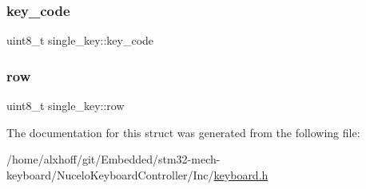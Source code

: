 \subsubsection{\texorpdfstring{key\+\_\+code}{key\_code}}
{\footnotesize\ttfamily uint8\+\_\+t single\+\_\+key\+::key\+\_\+code}

\mbox{\label{structsingle__key_a86c0464140fe262bd1f0271a95885733}} 
\subsubsection{\texorpdfstring{row}{row}}
{\footnotesize\ttfamily uint8\+\_\+t single\+\_\+key\+::row}



The documentation for this struct was generated from the following file\+:\begin{DoxyCompactItemize}
\item 
/home/alxhoff/git/\+Embedded/stm32-\/mech-\/keyboard/\+Nucelo\+Keyboard\+Controller/\+Inc/\hyperlink{keyboard_8h}{keyboard.\+h}\end{DoxyCompactItemize}

